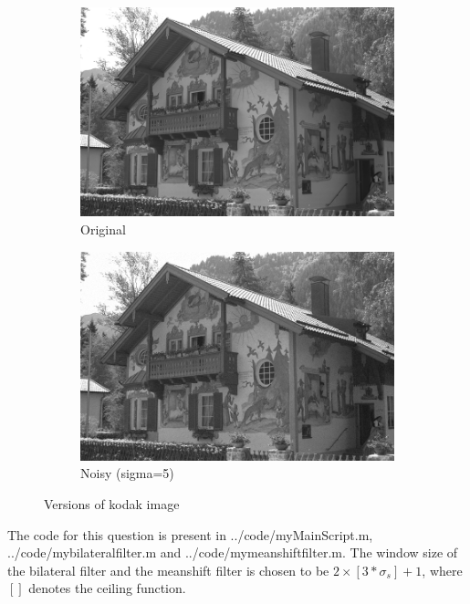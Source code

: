 \documentclass[12pt]{article}
\begin{document}
\begin{figure}[h]
    \centering
    \begin{subfigure}[b]{0.3\textwidth}
        \centering
        \includegraphics[width=\textwidth]{../images/kodak24.png}
        \caption{Original}
        \label{fig:subfig1}
    \end{subfigure}
    \begin{subfigure}[b]{0.3\textwidth}
        \centering
        \includegraphics[width=\textwidth]{../images/noisy_kodak24.png}
        \caption{Noisy (sigma=5)}
        \label{fig:subfig2}
    \end{subfigure}
    \caption{Versions of kodak image}
    \label{fig:kodak}
\end{figure}

The code for this question is present in {../code/myMainScript.m}, \\ {../code/mybilateralfilter.m} and {../code/mymeanshiftfilter.m}. The window size of the bilateral filter and the meanshift filter is chosen to be $2\times [3*\sigma_s] + 1$, where $[]$ denotes the ceiling function.
\end{document}
